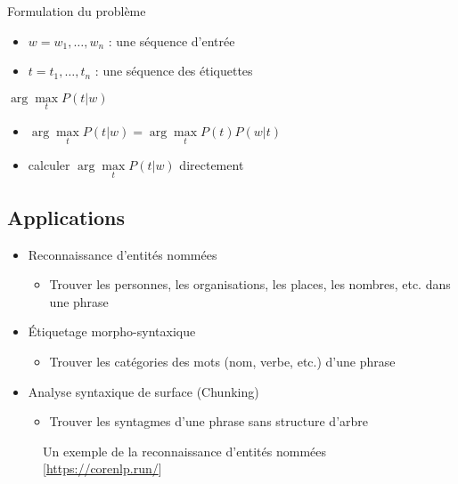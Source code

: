 \documentclass{KodeBook}
\begin{document}
\begin{block}{Formulation du problème}
	\begin{itemize}
		\item $w = w_1, \ldots, w_n$ : une séquence d'entrée
		\item $t = t_1, \ldots, t_n$ : une séquence des étiquettes
	\end{itemize}
	\begin{center}
		$ \arg\max\limits_t P(t | w)$
	\end{center}
	
	\begin{itemize}
		\item {} $ \arg\max\limits_t P(t | w) = \arg\max\limits_t P(t) P(w | t) $
		\item {} calculer $\arg\max\limits_t P(t | w)$ directement
	\end{itemize}
\end{block}

\subsection{Applications}

\begin{itemize}
	\item Reconnaissance d'entités nommées
	\begin{itemize}
		\item Trouver les personnes, les organisations, les places, les nombres, etc. dans une phrase
	\end{itemize}
	\item Étiquetage morpho-syntaxique
	\begin{itemize}
		\item Trouver les catégories des mots (nom, verbe, etc.) d'une phrase
	\end{itemize}
	\item Analyse syntaxique de surface (Chunking)
	\begin{itemize}
		\item Trouver les syntagmes d'une phrase sans structure d'arbre
	\end{itemize}
\end{itemize}

\begin{figure}
	\centering
	\caption{Un exemple de la reconnaissance d'entités nommées [\url{https://corenlp.run/}]}
\end{figure}
\end{document}
